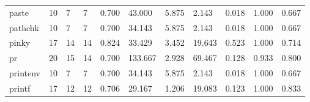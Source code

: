 \begin{longtable}{lp{1.8cm}p{1.8cm}p{1.8cm}p{1.8cm}p{1.8cm}p{1.8cm}p{1.8cm}p{1.8cm}p{1.8cm}p{1.8cm}}
paste     &                           10 &                  7 &                                 7 &                                      0.700 &                                 43.000 &                                        5.875 &                             2.143 &                                   0.018 &                              1.000 &                                              0.667 \\
pathchk   &                           10 &                  7 &                                 7 &                                      0.700 &                                 34.143 &                                        5.875 &                             2.143 &                                   0.018 &                              1.000 &                                              0.667 \\
pinky     &                           17 &                 14 &                                14 &                                      0.824 &                                 33.429 &                                        3.452 &                            19.643 &                                   0.523 &                              1.000 &                                              0.714 \\
pr        &                           20 &                 15 &                                14 &                                      0.700 &                                133.667 &                                        2.928 &                            69.467 &                                   0.128 &                              0.933 &                                              0.800 \\
printenv  &                           10 &                  7 &                                 7 &                                      0.700 &                                 34.143 &                                        5.875 &                             2.143 &                                   0.018 &                              1.000 &                                              0.667 \\
printf    &                           17 &                 12 &                                12 &                                      0.706 &                                 29.167 &                                        1.206 &                            19.083 &                                   0.123 &                              1.000 &                                              0.833 \\

\end{longtable}
